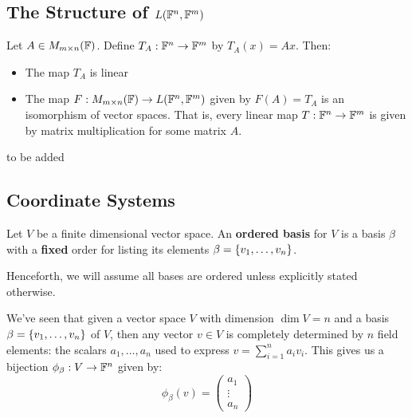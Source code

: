 \documentclass{article}
\begin{document}
\subsection{The Structure of \texorpdfstring{$ \relax{L}(\mathbb{F}^{n}, \mathbb{F}^{m}) $}{L(Fn, Fm)}}

\begin{thm}
Let $ A \in \relax{M}_{m \times n}(\mathbb{F}) $. Define $ T_{A}:\mathbb{F}^{n} \rightarrow \mathbb{F}^{m} $ by $ T_{A}(x) = Ax $. Then:
\begin{itemize}
    \item The map $ T_{A} $ is linear
    \item The map $ F: \relax{M}_{m \times n}(\mathbb{F}) \rightarrow \relax{L}(\mathbb{F}^{n}, \mathbb{F}^{m}) $ given by $ F(A) = T_{A} $ is an isomorphism of vector spaces.
        That is, every linear map $ T: \mathbb{F}^{n} \rightarrow \mathbb{F}^{m} $ is given by matrix multiplication for some matrix $ A $.
\end{itemize}
\end{thm}

\begin{pf}[source=Primary Source Material]
to be added
\end{pf}

\subsection{Coordinate Systems}

\begin{defn}
Let $ V $ be a finite dimensional vector space. An \textbf{ordered basis} for $ V $ is a basis $ \beta $ with a \textbf{fixed} order for listing its elements $ \beta = \left\{{v_{1}, \dots, v_{n}}\right\} $.
\end{defn}

Henceforth, we will assume all bases are ordered unless explicitly stated otherwise. \npgh

We've seen that given a vector space $ V $ with dimension $ \dim V = n $ and a basis $ \beta = \left\{{v_{1}, \dots, v_{n}}\right\} $ of $ V $, then
any vector $ v \in V $ is completely determined by $ n $ field elements: the scalars $ a_{1}, \dots, a_{n} $ used to express $ v = \displaystyle\sum_{i=1}^{n} {a_{i}v_{i}}  $.
This gives us a bijection $ \phi_{\beta} : V \rightarrow \mathbb{F}^{n} $ given by:
\begin{equation*}
    \phi_{\beta}(v) = \begin{pmatrix} a_{1} \\ \vdots \\ a_{n} \end{pmatrix}
\end{equation*}
\end{document}
